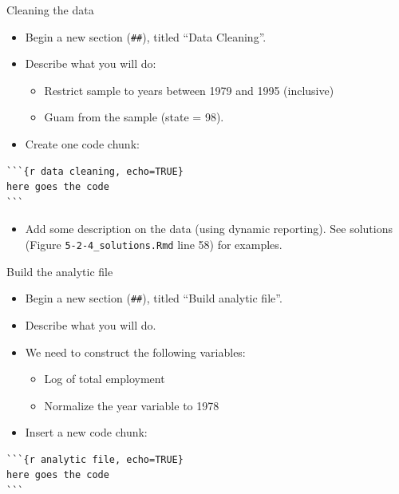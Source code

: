 \documentclass[ignorenonframetext,]{beamer}
\providecommand{\tightlist}{%
  \setlength{\itemsep}{0pt}\setlength{\parskip}{0pt}}
\begin{document}
\begin{frame}[fragile]{Cleaning the data}
\protect\hypertarget{cleaning-the-data}{}

\begin{itemize}
\tightlist
\item
  Begin a new section (\texttt{\#\#}), titled ``Data Cleaning''.\\
\item
  Describe what you will do:

  \begin{itemize}
  \tightlist
  \item
    Restrict sample to years between 1979 and 1995 (inclusive)\\
  \item
    Guam from the sample (state = 98).\\
  \end{itemize}
\item
  Create one code chunk:\\
\end{itemize}

\begin{verbatim}
```{r data cleaning, echo=TRUE}
here goes the code
```
\end{verbatim}

\begin{itemize}
\tightlist
\item
  Add some description on the data (using dynamic reporting). See
  solutions (Figure \texttt{5-2-4\_solutions.Rmd} line 58) for examples.
\end{itemize}

\end{frame}

\begin{frame}[fragile]{Build the analytic file}
\protect\hypertarget{build-the-analytic-file}{}

\begin{itemize}
\tightlist
\item
  Begin a new section (\texttt{\#\#}), titled ``Build analytic file''.\\
\item
  Describe what you will do.\\
\item
  We need to construct the following variables:

  \begin{itemize}
  \tightlist
  \item
    Log of total employment\\
  \item
    Normalize the year variable to 1978\\
  \end{itemize}
\item
  Insert a new code chunk:
\end{itemize}

\begin{verbatim}
```{r analytic file, echo=TRUE}
here goes the code
```
\end{verbatim}

\end{frame}
\end{document}
